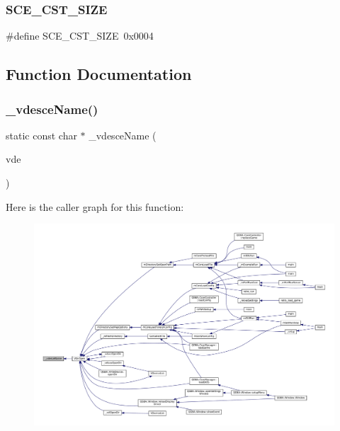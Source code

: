 \subsubsection{\texorpdfstring{S\+C\+E\+\_\+\+C\+S\+T\+\_\+\+S\+I\+ZE}{SCE\_CST\_SIZE}}
{\footnotesize\ttfamily \#define S\+C\+E\+\_\+\+C\+S\+T\+\_\+\+S\+I\+ZE~0x0004}



\subsection{Function Documentation}
\mbox{\label{sce-vfs_8c_a5e00b5ef51581ac1d41852c7f060a079}} 
\subsubsection{\texorpdfstring{\+\_\+vdesce\+Name()}{\_vdesceName()}}
{\footnotesize\ttfamily static const char $\ast$ \+\_\+vdesce\+Name (\begin{DoxyParamCaption}\item[{struct V\+Dir\+Entry $\ast$}]{vde }\end{DoxyParamCaption})\hspace{0.3cm}{\ttfamily [static]}}

Here is the caller graph for this function\+:
\nopagebreak
\begin{figure}[H]
\begin{center}
\leavevmode
\includegraphics[width=350pt]{sce-vfs_8c_a5e00b5ef51581ac1d41852c7f060a079_icgraph}
\end{center}
\end{figure}
\mbox{\label{sce-vfs_8c_a81d276ea328a06eb57ab98160bfb6713}} 
